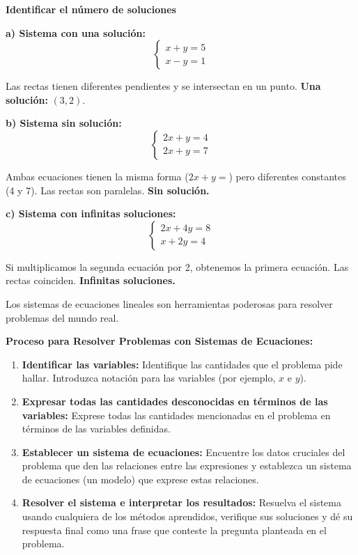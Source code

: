 \begin{example}
\textbf{Identificar el número de soluciones}

\textbf{a) Sistema con una solución:}
$$\begin{cases}
x + y = 5 \\
x - y = 1
\end{cases}$$

Las rectas tienen diferentes pendientes y se intersectan en un punto. \textbf{Una solución:} $(3, 2)$.

\textbf{b) Sistema sin solución:}
$$\begin{cases}
2x + y = 4 \\
2x + y = 7
\end{cases}$$

Ambas ecuaciones tienen la misma forma ($2x + y =$) pero diferentes constantes (4 y 7). Las rectas son paralelas. \textbf{Sin solución.}

\textbf{c) Sistema con infinitas soluciones:}
$$\begin{cases}
2x + 4y = 8 \\
x + 2y = 4
\end{cases}$$

Si multiplicamos la segunda ecuación por 2, obtenemos la primera ecuación. Las rectas coinciden. \textbf{Infinitas soluciones.}
\end{example}

\newpage

Los sistemas de ecuaciones lineales son herramientas poderosas para resolver problemas del mundo real.

\begin{theorem}
\textbf{Proceso para Resolver Problemas con Sistemas de Ecuaciones:}

\begin{enumerate}
    \item \textbf{Identificar las variables:} Identifique las cantidades que el problema pide hallar. Introduzca notación para las variables (por ejemplo, $x$ e $y$).

    \item \textbf{Expresar todas las cantidades desconocidas en términos de las variables:} Exprese todas las cantidades mencionadas en el problema en términos de las variables definidas.

    \item \textbf{Establecer un sistema de ecuaciones:} Encuentre los datos cruciales del problema que den las relaciones entre las expresiones y establezca un sistema de ecuaciones (un modelo) que exprese estas relaciones.

    \item \textbf{Resolver el sistema e interpretar los resultados:} Resuelva el sistema usando cualquiera de los métodos aprendidos, verifique sus soluciones y dé su respuesta final como una frase que conteste la pregunta planteada en el problema.
\end{enumerate}
\end{theorem}

